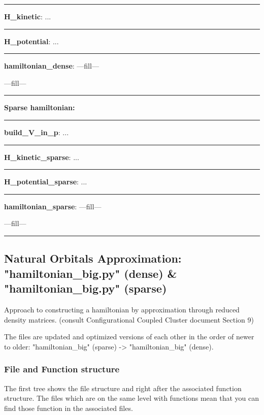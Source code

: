 \documentclass[a4paper,10pt]{article}
\begin{document}
\noindent\rule{\linewidth}{0.4pt}

\textbf{H\_kinetic}: ...

\noindent\rule{\linewidth}{0.4pt}

\textbf{H\_potential}: ...

\noindent\rule{\linewidth}{0.4pt}

\textbf{hamiltonian\_dense}: ---fill---

---fill---

\noindent\rule{\linewidth}{0.4pt}


\textbf{\newline Sparse hamiltonian:}

\noindent\rule{\linewidth}{0.4pt}

\textbf{build\_V\_in\_p}: ...

\noindent\rule{\linewidth}{0.4pt}

\textbf{H\_kinetic\_sparse}: ...

\noindent\rule{\linewidth}{0.4pt}

\textbf{H\_potential\_sparse}: ...

\noindent\rule{\linewidth}{0.4pt}

\textbf{hamiltonian\_sparse}: ---fill---

---fill---

\noindent\rule{\linewidth}{0.4pt}




\subsection{Natural Orbitals Approximation: "hamiltonian\_big.py" (dense) \& "hamiltonian\_big.py" (sparse) }

Approach to constructing a hamiltonian by approximation through reduced density matrices. (consult Configurational Coupled Cluster document Section 9)

The files are updated and optimized versions of each other in the order of newer to older: "hamiltonian\_big" (sparse) -> "hamiltonian\_big" (dense).



\subsubsection{File and Function structure}

The first tree shows the file structure and right after the associated function structure. The files which are on the same level with functions mean that you can find those function in the associated files.
\end{document}
